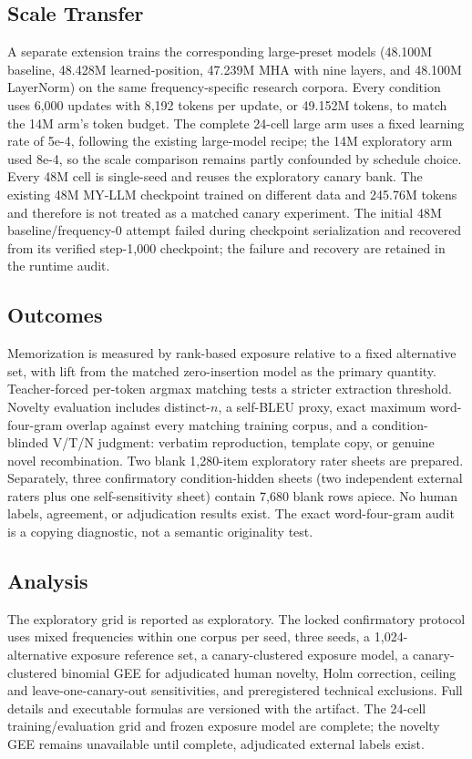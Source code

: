\documentclass[conference]{IEEEtran}
\begin{document}
\subsection{Scale Transfer}
A separate extension trains the corresponding large-preset models (48.100M baseline, 48.428M learned-position,
47.239M MHA with nine layers, and 48.100M LayerNorm) on the same frequency-specific research corpora. Every
condition uses 6,000 updates with 8,192 tokens per update, or 49.152M tokens, to match the 14M arm's token budget.
The complete 24-cell large arm uses a fixed learning rate of 5e-4, following the existing large-model recipe; the
14M exploratory arm used 8e-4, so the scale comparison remains partly confounded by schedule choice. Every 48M
cell is single-seed and reuses the exploratory canary bank. The existing 48M MY-LLM checkpoint trained on
different data and 245.76M tokens and therefore is not treated as a matched canary experiment. The initial
48M baseline/frequency-0 attempt failed during checkpoint serialization and recovered from its verified step-1,000
checkpoint; the failure and recovery are retained in the runtime audit.

\subsection{Outcomes}
Memorization is measured by rank-based exposure relative to a fixed alternative set, with lift from the matched
zero-insertion model as the primary quantity. Teacher-forced per-token argmax matching tests a stricter extraction
threshold. Novelty evaluation includes distinct-$n$, a self-BLEU proxy, exact maximum word-four-gram overlap
against every matching training corpus, and a condition-blinded V/T/N judgment: verbatim reproduction, template
copy, or genuine novel recombination. Two blank 1,280-item exploratory rater sheets are prepared. Separately,
three confirmatory condition-hidden sheets (two independent external raters plus one self-sensitivity sheet)
contain 7,680 blank rows apiece. No human labels, agreement, or adjudication results exist. The exact
word-four-gram audit is a copying diagnostic, not a semantic originality test.

\subsection{Analysis}
The exploratory grid is reported as exploratory. The locked confirmatory protocol uses mixed frequencies within
one corpus per seed, three seeds, a 1,024-alternative exposure reference set, a canary-clustered exposure model,
a canary-clustered binomial GEE for adjudicated human novelty, Holm correction, ceiling and leave-one-canary-out
sensitivities, and preregistered technical exclusions. Full details and executable formulas are versioned with
the artifact. The 24-cell training/evaluation grid and frozen exposure model are complete; the novelty GEE
remains unavailable until complete, adjudicated external labels exist.
\end{document}
